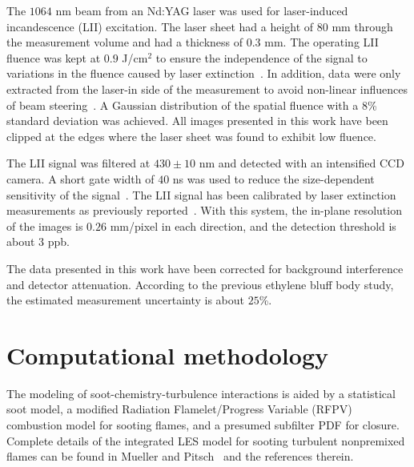 \documentclass[review,3p,times]{elsarticle}
\begin{document}
The $1064$ nm beam from an Nd:YAG laser was used for laser-induced incandescence (LII) excitation.  The laser sheet had a height of $80$ mm through the measurement volume and had a thickness of $0.3$ mm.  The operating LII fluence was kept at $0.9$ J/cm$^2$ to ensure the independence of the signal to variations in the fluence caused by laser extinction~\cite{qamar09,schulz06}.  In addition, data were only extracted from the laser-in side of the measurement to avoid non-linear influences of beam steering~\cite{sun15}.  A Gaussian distribution of the spatial fluence with a $8$\% standard deviation was achieved.  All images presented in this work have been clipped at the edges where the laser sheet was found to exhibit low fluence.   

The LII signal was filtered at $430 \pm 10$ nm and detected with an intensified CCD camera.  A short gate width of $40$ ns was used to reduce the size-dependent sensitivity of the signal~\cite{bladh08}.  The LII signal has been calibrated by laser extinction measurements as previously reported~\cite{mueller13}.  With this system, the in-plane resolution of the images is $0.26$ mm/pixel in each direction, and the detection threshold is about $3$ ppb.

The data presented in this work have been corrected for background interference and detector attenuation.  According to the previous ethylene bluff body study, the estimated measurement uncertainty is about $25$\%.  

 

\section{Computational methodology} \label{sec:computation}


The modeling of soot-chemistry-turbulence interactions is aided by a statistical soot model, a modified Radiation Flamelet/Progress Variable (RFPV) combustion model for sooting flames, and a presumed subfilter PDF for closure.  Complete details of the integrated LES model for sooting turbulent nonpremixed flames can be found in Mueller and Pitsch~\cite{mueller12} and the references therein.
\end{document}
